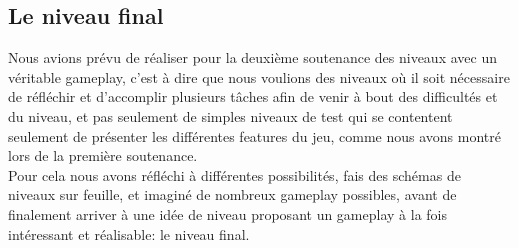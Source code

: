 \documentclass[12pt]{article}
\begin{document}
\subsection{Le niveau final}

Nous avions prévu de réaliser pour la deuxième soutenance des niveaux avec un véritable gameplay, c'est à dire que nous voulions des niveaux où il soit nécessaire de réfléchir et d'accomplir plusieurs tâches afin de venir à bout des difficultés et du niveau, et pas seulement de simples niveaux de test qui se contentent seulement de présenter les différentes features du jeu, comme nous avons montré lors de la première soutenance.\\
Pour cela nous avons réfléchi à différentes possibilités, fais des schémas de niveaux sur feuille, et imaginé de nombreux gameplay possibles, avant de finalement arriver à une idée de niveau proposant un gameplay à la fois intéressant et réalisable: le niveau final.\\
\end{document}
